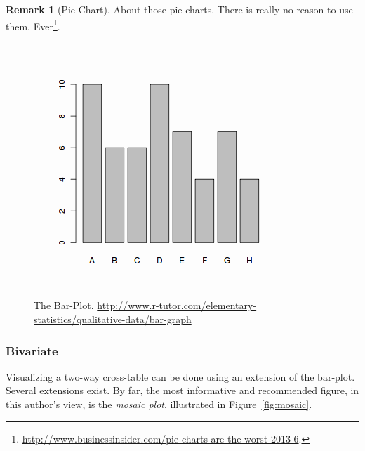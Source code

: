 \documentclass[12pt,a4paper]{report}
\theoremstyle{plain}
\theoremstyle{definition}
\newtheorem{remark}{Remark}
\begin{document}
\begin{remark}[Pie Chart]
About those pie charts. 
There is really no reason to use them. Ever\footnote{\url{http://www.businessinsider.com/pie-charts-are-the-worst-2013-6}.}.
\end{remark}



\begin{figure}[h]
\centering
\includegraphics[height=0.3\textheight]{art/categorical-data1x}
\caption[Bar Plot]{The Bar-Plot. \newline
\url{http://www.r-tutor.com/elementary-statistics/qualitative-data/bar-graph}}
\label{fig:barplot}
\end{figure}



\subsubsection{Bivariate}
Visualizing a two-way cross-table can be done using an extension of the bar-plot.
Several extensions exist. By far, the most informative and recommended figure, in this author's view, is the \emph{mosaic plot}, illustrated in Figure~\ref{fig:mosaic}. 
\end{document}
